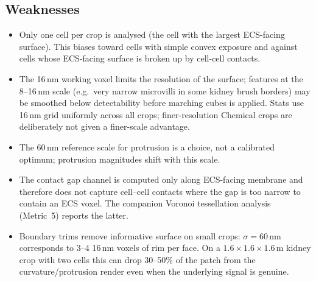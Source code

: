 \subsection*{Weaknesses}
\begin{itemize}[nosep]
\item Only one cell per crop is analysed (the cell with the largest
ECS-facing surface). This biases toward cells with simple convex
exposure and against cells whose ECS-facing surface is broken up by
cell-cell contacts.
\item The 16\,nm working voxel limits the resolution of the surface;
features at the 8--16\,nm scale (e.g.~very narrow microvilli in some
kidney brush borders) may be smoothed below detectability before
marching cubes is applied. Stats use 16\,nm grid uniformly across all
crops; finer-resolution Chemical crops are deliberately not given a
finer-scale advantage.
\item The 60\,nm reference scale for protrusion is a choice, not a
calibrated optimum; protrusion magnitudes shift with this scale.
\item The contact gap channel is computed only along ECS-facing
membrane and therefore does not capture cell--cell contacts where
the gap is too narrow to contain an ECS voxel. The companion
Voronoi tessellation analysis (Metric~5) reports the latter.
\item Boundary trims remove informative surface on small crops:
$\sigma = 60$\,nm corresponds to 3--4 16\,nm voxels of rim per face.
On a $1.6 \times 1.6 \times 1.6$\,\micro m kidney crop with two cells
this can drop 30--50\% of the patch from the curvature/protrusion
render even when the underlying signal is genuine.
\end{itemize}

